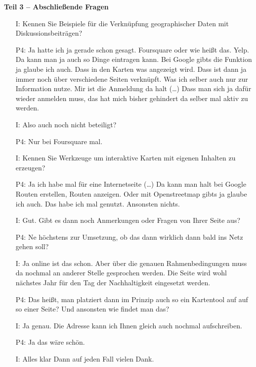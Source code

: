 \textbf{Teil 3 -- Abschlie{\ss}ende Fragen}
\begin{itemize}
    \item[I:] Kennen Sie Beispiele f{\"u}r die Verkn{\"u}pfung geographischer Daten mit Diskussionsbeitr{\"a}gen?
    \item[P4:] Ja hatte ich ja gerade schon gesagt. Foursquare oder wie hei{\ss}t das. Yelp. Da kann man ja auch so Dinge eintragen kann. Bei Google gibts die Funktion ja glaube ich auch. Dass in den Karten was angezeigt wird. Dass ist dann ja immer noch {\"u}ber verschiedene Seiten verkn{\"u}pft. Was ich selber auch nur zur Information nutze. Mir ist die Anmeldung da halt (\dots) Dass man sich ja daf{\"u}r wieder anmelden muss, das hat mich bisher gehindert da selber mal aktiv zu werden.
    \item[I:] Also auch noch nicht beteiligt?
    \item[P4:] Nur bei Foursquare mal.
    \item[I:] Kennen Sie Werkzeuge um interaktive Karten mit eigenen Inhalten zu erzeugen?
    \item[P4:] Ja ich habe mal f{\"u}r eine Internetseite (\dots) Da kann man halt bei Google Routen erstellen, Routen anzeigen. Oder mit Openstreetmap gibts ja glaube ich auch. Das habe ich mal genutzt. Ansonsten nichts.
    \item[I:] Gut. Gibt es dann noch Anmerkungen oder Fragen von Ihrer Seite aus?
    \item[P4:] Ne h{\"o}chstens zur Umsetzung, ob das dann wirklich dann bald ins Netz gehen soll?
    \item[I:] Ja online ist das schon. Aber {\"u}ber die genauen Rahmenbedingungen muss da nochmal an anderer Stelle gesprochen werden. Die Seite wird wohl n{\"a}chstes Jahr f{\"u}r den Tag der Nachhaltigkeit eingesetzt werden.
    \item[P4:] Das hei{\ss}t, man platziert dann im Prinzip auch so ein Kartentool auf auf so einer Seite? Und ansonsten wie findet man das?
    \item[I:] Ja genau. Die Adresse kann ich Ihnen gleich auch nochmal aufschreiben.
    \item[P4:] Ja das w{\"a}re sch{\"o}n.
    \item[I:] Alles klar Dann auf jeden Fall vielen Dank.
\end{itemize}